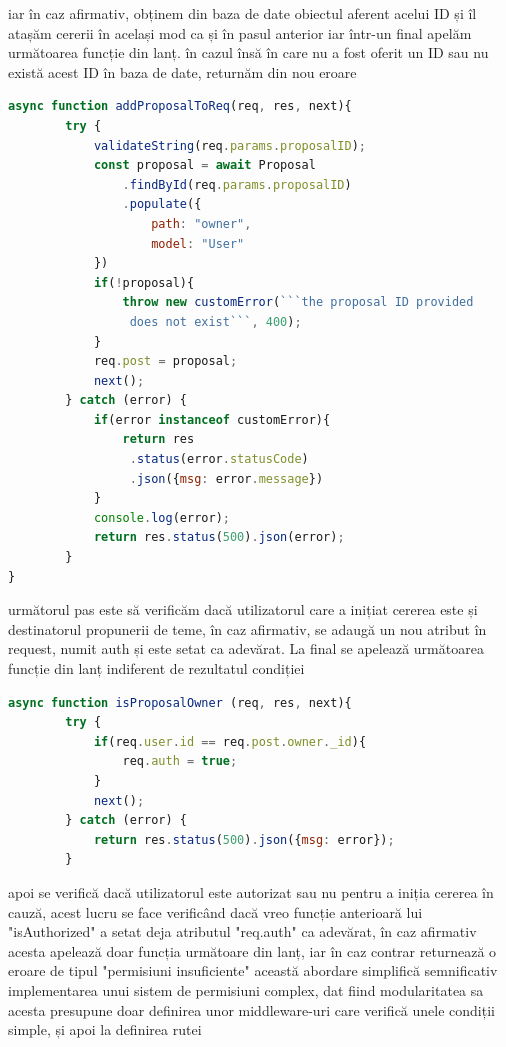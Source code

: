 \documentclass[12pt,a4paper,hidelinks]{report}
\theoremstyle{definition}
\theoremstyle{remark}
\begin{document}
    iar în caz afirmativ, obținem din baza de date obiectul aferent acelui ID și îl atașăm cererii în același mod ca și în pasul anterior 
    iar într-un final apelăm următoarea funcție din lanț. în cazul însă în care nu a fost oferit un ID sau nu există acest ID în baza de date, returnăm din nou eroare
    \begin{lstlisting}[language=Javascript]
    async function addProposalToReq(req, res, next){
        try {
            validateString(req.params.proposalID);
            const proposal = await Proposal
                .findById(req.params.proposalID)
                .populate({
                    path: "owner",
                    model: "User"
            })
            if(!proposal){
                throw new customError(```the proposal ID provided
                 does not exist```, 400);
            }
            req.post = proposal;
            next();
        } catch (error) {
            if(error instanceof customError){
                return res
                 .status(error.statusCode)
                 .json({msg: error.message})
            }
            console.log(error);
            return res.status(500).json(error);   
        }
}
    \end{lstlisting}
    următorul pas este să verificăm dacă utilizatorul care a inițiat cererea este și destinatorul propunerii de teme,
    în caz afirmativ, se adaugă un nou atribut în request, numit auth și este setat ca adevărat.
    La final se apelează următoarea funcție din lanț indiferent de rezultatul condiției
    \begin{lstlisting}[language=Javascript]
        async function isProposalOwner (req, res, next){
        try {
            if(req.user.id == req.post.owner._id){
                req.auth = true;
            }
            next();
        } catch (error) {
            return res.status(500).json({msg: error});
        }
    \end{lstlisting}
    apoi se verifică dacă utilizatorul este autorizat sau nu pentru a iniția cererea în cauză, acest lucru se face verificând
    dacă vreo funcție anterioară lui "isAuthorized" a setat deja atributul "req.auth" ca adevărat, în caz afirmativ
    acesta apelează doar funcția următoare din lanț, iar în caz contrar returnează o eroare de tipul "permisiuni insuficiente"
    această abordare simplifică semnificativ implementarea unui sistem de permisiuni complex, dat fiind modularitatea sa
    acesta presupune doar definirea unor middleware-uri care verifică unele condiții simple, și apoi la definirea rutei
\end{document}
